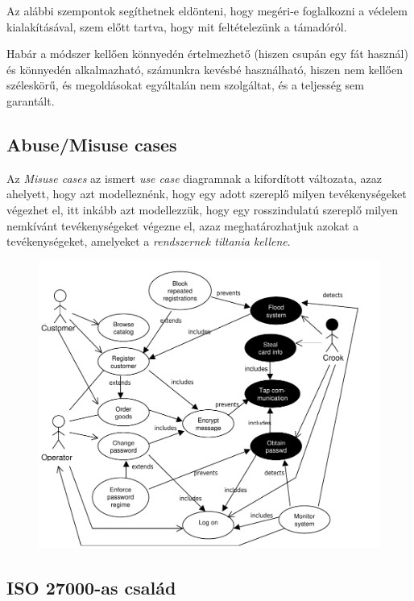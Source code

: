 
Az alábbi szempontok segíthetnek eldönteni, hogy megéri-e foglalkozni a védelem kialakításával,
szem előtt tartva, hogy mit feltételezünk a támadóról.

Habár a módszer kellően könnyedén értelmezhető (hiszen csupán egy fát használ) és könnyedén
alkalmazható, számunkra kevésbé használható, hiszen nem kellően széleskörű, és megoldásokat egyáltalán nem szolgáltat,
és a teljesség sem garantált.

\subsection{Abuse/Misuse cases}

Az \emph{Misuse cases} az ismert \emph{use case} diagramnak a kifordított változata, azaz ahelyett,
hogy azt modelleznénk, hogy egy adott szereplő milyen tevékenységeket végezhet el, itt inkább azt
modellezzük, hogy egy rosszindulatú szereplő milyen nemkívánt tevékenységeket végezne el, azaz
meghatározhatjuk azokat a tevékenységeket, amelyeket a \emph{rendszernek tiltania kellene}.

\begin{figure}[h]
    \centering
    \includegraphics[width=\textwidth, height=0.25\textheight, keepaspectratio]{figures/misusecase.png}
\end{figure}

\FloatBarrier
\subsection{ISO 27000-as család}
